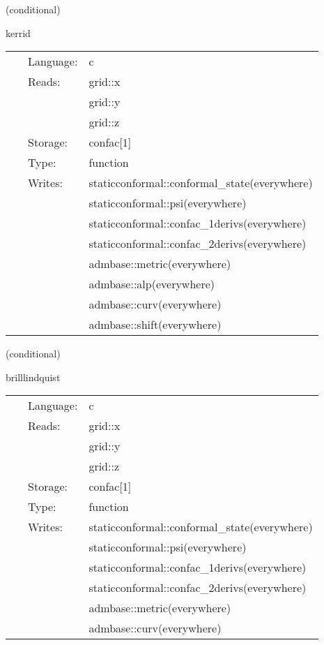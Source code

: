 \documentclass{article}
\begin{document}
\vspace{5mm}

   (conditional) 

\hspace{5mm} kerrid 

\hspace{5mm}{\it construct initial data for a single kerr black hole } 


\hspace{5mm}

 \begin{tabular*}{160mm}{cll} 
~ & Language:  & c \\ 
~ & Reads:  & grid::x \\ 
~& ~ &grid::y\\ 
~& ~ &grid::z\\ 
~ & Storage:  & confac[1] \\ 
~ & Type:  & function \\ 
~ & Writes:  & staticconformal::conformal\_state(everywhere) \\ 
~& ~ &staticconformal::psi(everywhere)\\ 
~& ~ &staticconformal::confac\_1derivs(everywhere)\\ 
~& ~ &staticconformal::confac\_2derivs(everywhere)\\ 
~& ~ &admbase::metric(everywhere)\\ 
~& ~ &admbase::alp(everywhere)\\ 
~& ~ &admbase::curv(everywhere)\\ 
~& ~ &admbase::shift(everywhere)\\ 
\end{tabular*} 


\vspace{5mm}

   (conditional) 

\hspace{5mm} brilllindquist 

\hspace{5mm}{\it construct initial data for brill lindquist black holes } 


\hspace{5mm}

 \begin{tabular*}{160mm}{cll} 
~ & Language:  & c \\ 
~ & Reads:  & grid::x \\ 
~& ~ &grid::y\\ 
~& ~ &grid::z\\ 
~ & Storage:  & confac[1] \\ 
~ & Type:  & function \\ 
~ & Writes:  & staticconformal::conformal\_state(everywhere) \\ 
~& ~ &staticconformal::psi(everywhere)\\ 
~& ~ &staticconformal::confac\_1derivs(everywhere)\\ 
~& ~ &staticconformal::confac\_2derivs(everywhere)\\ 
~& ~ &admbase::metric(everywhere)\\ 
~& ~ &admbase::curv(everywhere)\\ 
\end{tabular*} 
\end{document}
